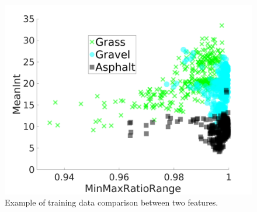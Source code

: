 \documentclass[journal,onecolumn]{IEEEtran}
\begin{document}
			\begin{figure}[H]
			\centering
			\includegraphics[width=0.9\linewidth]{figures/training_data_cluster_3}
			\caption[Example Clustering]{Example of training data comparison between two features.}
			\label{fig:training_data_cluster_2}
			\end{figure}
		
			
\end{document}
